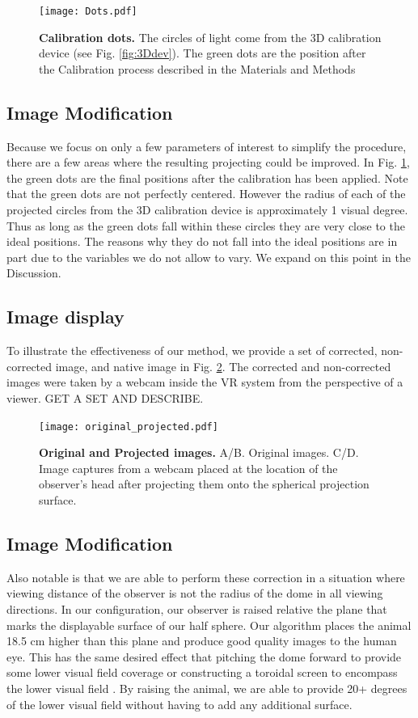 \documentclass[10pt,letterpaper]{article}
\begin{document}
\begin{figure}[h]
\centering
\texttt{[image: Dots.pdf]}
\caption{{\bf Calibration dots.}
The circles of light come from the 3D calibration device (see Fig. \ref{fig:3Ddev}). The green dots are the position after the Calibration process described in the Materials and Methods}
\label{fig:Dots}
\end{figure}
\subsection*{Image Modification}
Because we focus on only a few parameters of interest to simplify the
procedure, there are a few areas where the resulting projecting could be
improved. In Fig. \ref{fig:Dots}, the green dots are the final positions after
the calibration has been applied. Note that the green dots are not perfectly
centered. However the radius of each of the projected circles from the 3D
calibration device is approximately 1 visual degree. Thus as long as the green
dots fall within these circles they are very close to the ideal positions. The
reasons why they do not fall into the ideal positions are in part due to the
variables we do not allow to vary. We expand on this point in the Discussion.

\subsection*{Image display}

To illustrate the effectiveness of our method, we provide a set of corrected,
non-corrected image, and native image in Fig. \ref{fig:Compare}. The corrected
and non-corrected images were taken by a webcam inside the VR system from the
perspective of a viewer. GET A SET AND DESCRIBE. 

\begin{figure}[h]
\centering
\texttt{[image: original\_projected.pdf]}
\caption{{\bf Original and Projected images.} A/B. Original images. C/D. Image
        captures from a webcam placed at the location of the observer's head
        after projecting them onto the spherical projection surface.}

\label{fig:Compare}
\end{figure}

\subsection*{Image Modification}
Also notable is that we are able to perform these correction in a situation
where viewing distance of the observer is not the radius of the dome in all
viewing directions.  In our configuration, our observer is raised relative the
plane that marks the displayable surface of our half sphere. Our algorithm
places the animal 18.5 cm higher than this plane and produce good quality
images to the human eye. This has the same desired effect that pitching the
dome forward to provide some lower visual field coverage
\cite{schmidt2013cellular} or constructing a toroidal screen to encompass the
lower visual field \cite{holscher2005rats, harvey2009intracellular}. By raising
the animal, we are able to provide 20+ degrees of the lower visual field
without having to add any additional surface. 
\end{document}
